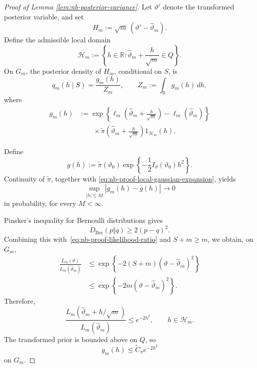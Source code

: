 \documentclass{article}
\theoremstyle{named}
\theoremstyle{named1}
\theoremstyle{plain}
\theoremstyle{remark}
\begin{document}
\begin{proof}[Proof of Lemma \ref{lem:nb-posterior-variance}]
Let \(\vartheta'\) denote the transformed posterior variable, and set
\[
    H_m
    :=
    \sqrt m\,(\vartheta'-\widehat\vartheta_m).
\]
Define the admissible local domain
\[
    \mathcal H_m
    :=
    \left\{
        h\in\mathbb R:
        \widehat\vartheta_m+\frac{h}{\sqrt m}\in Q
    \right\}.
\]
On \(G_m\), the posterior density of \(H_m\), conditional on \(S\),
is
\begin{equation}
    q_m(h\mid S)
    =
    \frac{g_m(h)}{Z_m},
    \qquad
    Z_m:=\int_{\mathbb R}g_m(h)\,dh,
    \label{eq:nb-proof-local-posterior}
\end{equation}
where
\begin{equation}
\begin{split}
    g_m(h)
    &:=
    \exp\left\{
        \ell_m\left(
            \widehat\vartheta_m+\frac{h}{\sqrt m}
        \right)
        -
        \ell_m(\widehat\vartheta_m)
    \right\}
    \\
    &\qquad\times
    \widetilde\pi\left(
        \widehat\vartheta_m+\frac{h}{\sqrt m}
    \right)
    1_{\mathcal H_m}(h).
\end{split}
    \label{eq:nb-proof-unnormalized-posterior}
\end{equation}

Define
\[
    g(h)
    :=
    \widetilde\pi(\vartheta_0)
    \exp\left\{
        -\frac12 I_\vartheta(\vartheta_0)h^2
    \right\}.
\]
Continuity of \(\widetilde\pi\), together with
\eqref{eq:nb-proof-local-gaussian-expansion}, yields
\begin{equation}
    \sup_{|h|\leq M}|g_m(h)-g(h)|
    \rightarrow0
    \label{eq:nb-proof-local-density-convergence}
\end{equation}
in probability, for every \(M<\infty\).



Pinsker's inequality for Bernoulli distributions gives
\[
    D_{\mathrm{Ber}}(p\Vert q)
    \geq
    2(p-q)^2.
\]
Combining this with~\eqref{eq:nb-proof-likelihood-ratio} and
\(S+m\geq m\), we obtain, on \(G_m\),
\begin{align}
    \frac{L_m(\vartheta)}
         {L_m(\widehat\vartheta_m)}
    &\leq
    \exp\left\{
        -2(S+m)
        (\vartheta-\widehat\vartheta_m)^2
    \right\}
    \nonumber\\
    &\leq
    \exp\left\{
        -2m(\vartheta-\widehat\vartheta_m)^2
    \right\}.
    \label{eq:nb-proof-global-likelihood-bound}
\end{align}
Therefore,
\begin{equation}
    \frac{
        L_m(\widehat\vartheta_m+h/\sqrt m)
    }{
        L_m(\widehat\vartheta_m)
    }
    \leq e^{-2h^2},
    \qquad h\in\mathcal H_m.
    \label{eq:nb-proof-local-likelihood-bound}
\end{equation}
The transformed prior is bounded above on \(Q\), so
\begin{equation}
    g_m(h)
    \leq
    \widetilde C_\pi e^{-2h^2}
    \label{eq:nb-proof-unnormalized-envelope}
\end{equation}
on \(G_m\).






\end{proof}
\end{document}
